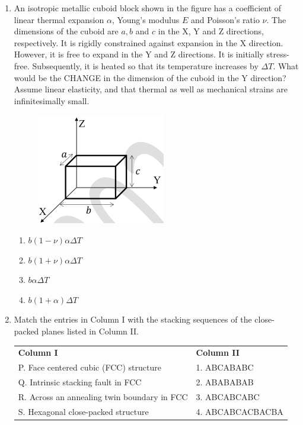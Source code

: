 \documentclass[journal]{IEEEtran}
\theoremstyle{remark}
\begin{document}
\begin{enumerate}[resume]
\item An isotropic metallic cuboid block shown in the figure has a coefficient of linear thermal expansion $\alpha$, Young's modulus $E$ and Poisson's ratio $\nu$. The dimensions of the cuboid are $a, b$ and $c$ in the X, Y and Z directions, respectively. It is rigidly constrained against expansion in the X direction. However, it is free to expand in the Y and Z directions. It is initially stress-free. Subsequently, it is heated so that its temperature increases by $\Delta T$. What would be the CHANGE in the dimension of the cuboid in the Y direction? Assume linear elasticity, and that thermal as well as mechanical strains are infinitesimally small. \hfill{}
\begin{figure}[H]
    \centering
    \includegraphics[width=0.3\columnwidth]{figs/Q.43.png}
    \caption{}
    \label{fig:placeholder}
\end{figure}
\begin{multicols}{2}
\begin{enumerate}
\item $b(1 - \nu)\alpha\Delta T$
\item $b(1 + \nu)\alpha\Delta T$
\item $b\alpha\Delta T$
\item $b(1 + \alpha)\Delta T$
\end{enumerate}
\end{multicols}

\item Match the entries in Column I with the stacking sequences of the close-packed planes listed in Column II. \hfill{}
\begin{center}
\begin{tabular}{ll}
\textbf{Column I} & \textbf{Column II} \\
P. Face centered cubic (FCC) structure & 1. ABCABABC \\
Q. Intrinsic stacking fault in FCC & 2. ABABABAB \\
R. Across an annealing twin boundary in FCC & 3. ABCABCABC \\
S. Hexagonal close-packed structure & 4. ABCABCACBACBA \\
\end{tabular}
\end{center}
\begin{multicols}{2}


\end{multicols}
\end{enumerate}
\end{document}
